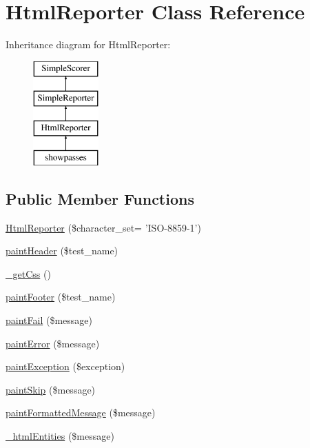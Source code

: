 \hypertarget{class_html_reporter}{
\section{HtmlReporter Class Reference}
\label{class_html_reporter}
}
Inheritance diagram for HtmlReporter:\begin{figure}[H]
\begin{center}
\leavevmode
\includegraphics[height=4.000000cm]{class_html_reporter}
\end{center}
\end{figure}
\subsection*{Public Member Functions}
\begin{DoxyCompactItemize}
\item 
\hyperlink{class_html_reporter_ad515762c037bcb2b06d8dcf347ab1d40}{HtmlReporter} (\$character\_\-set= 'ISO-\/8859-\/1')
\item 
\hyperlink{class_html_reporter_a1d579bc4e86295e07da8f4e364092010}{paintHeader} (\$test\_\-name)
\item 
\hyperlink{class_html_reporter_ad07ccfd2972eaa99fb57055f430ec498}{\_\-getCss} ()
\item 
\hyperlink{class_html_reporter_a7397e35688d992bc2cfb17c973a980b4}{paintFooter} (\$test\_\-name)
\item 
\hyperlink{class_html_reporter_a5e19e29324ad91541a15586032744136}{paintFail} (\$message)
\item 
\hyperlink{class_html_reporter_af6c7e574ee27fa12c6c9299aa6939727}{paintError} (\$message)
\item 
\hyperlink{class_html_reporter_a13348c829f8853d8ad061b6b6112f5b8}{paintException} (\$exception)
\item 
\hyperlink{class_html_reporter_a6414bae0e65badca0d33030bd281f884}{paintSkip} (\$message)
\item 
\hyperlink{class_html_reporter_ac759b018db079ff7f6cc45ee43d3ef12}{paintFormattedMessage} (\$message)
\item 
\hyperlink{class_html_reporter_aac72f7e2d9ed9e802ebd7ef1eca8e3c7}{\_\-htmlEntities} (\$message)
\end{DoxyCompactItemize}
